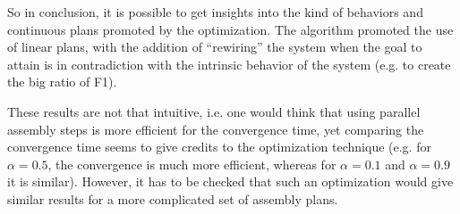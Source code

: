 
    So in conclusion, it is possible to get insights into the kind of behaviors and continuous plans promoted by the optimization. The algorithm promoted the use of linear plans, with the addition of ``rewiring'' the system when the goal to attain is in contradiction with the intrinsic behavior of the system (e.g. to create the big ratio of F1).

    These results are not that intuitive, i.e. one would think that using parallel assembly steps is more efficient for the convergence time, yet comparing the convergence time seems to give credits to the optimization technique (e.g. for $\alpha = 0.5$, the convergence is much more efficient, whereas for $\alpha=0.1$ and $\alpha=0.9$ it is similar).
    However, it has to be checked that such an optimization would give similar results for a more complicated set of assembly plans.
